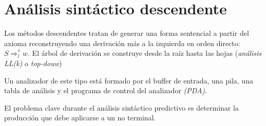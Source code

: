 %
%
%
%

\section{Análisis sintáctico descendente}

Los métodos descendentes tratan de generar una forma sentencial  a partir del axioma reconstruyendo una  derivación más a la izquierda en orden directo: $S\Rightarrow_{l}^{*}w$. El árbol de derivación se construye desde la raíz hasta las hojas (\textit{análisis LL(k)} o \textit{top-douw})

Un analizador de este tipo está formado por el buffer de entrada, una pila, una tabla de análisis y el programa de control del analizador \textit{(PDA)}.


El problema clave durante el análisis sintáctico predictivo es determinar la producción que debe aplicarse a un no terminal. 

